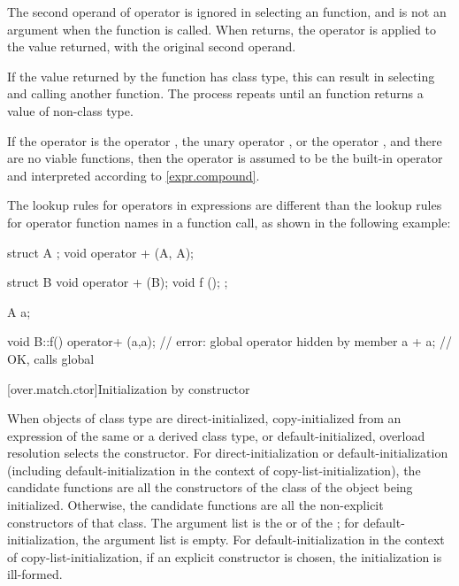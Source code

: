\pnum
The second operand of operator
\tcode{->}
is ignored in selecting an
function, and is not an argument when the
function is called.
When
returns, the operator
\tcode{->}
is applied to the value returned, with the original second
operand.
\begin{footnote}
If the value returned by the
function has class type, this can result in selecting and calling another
function.
The process repeats until an
function returns a value of non-class type.
\end{footnote}

\pnum
If the operator is the operator
\tcode{,},
the unary operator
\tcode{\&},
or the operator
\tcode{->},
and there are no viable functions, then the operator is
assumed to be the built-in operator and interpreted according to
\ref{expr.compound}.

\pnum
\begin{note}
The lookup rules for operators in expressions are different than
the lookup
rules for operator function names in a function call, as shown in the following
example:

\begin{codeblock}
struct A { };
void operator + (A, A);

struct B {
  void operator + (B);
  void f ();
};

A a;

void B::f() {
  operator+ (a,a);              // error: global operator hidden by member
  a + a;                        // OK, calls global 
}
\end{codeblock}
\end{note}

[over.match.ctor]{Initialization by constructor}%

\pnum
When objects of class type are direct-initialized,
copy-initialized from an expression of the same or a
derived class type,
or default-initialized,
overload resolution selects the constructor.
For direct-initialization or default-initialization
(including default-initialization in the context of copy-list-initialization),
the candidate functions are
all the constructors of the class of the object being
initialized.
Otherwise, the candidate functions are all
the non-explicit constructors of that
class.
The argument list is the
 or 
of the ;
for default-initialization, the argument list is empty.
For default-initialization in the context of copy-list-initialization,
if an explicit constructor is chosen, the initialization is ill-formed.

